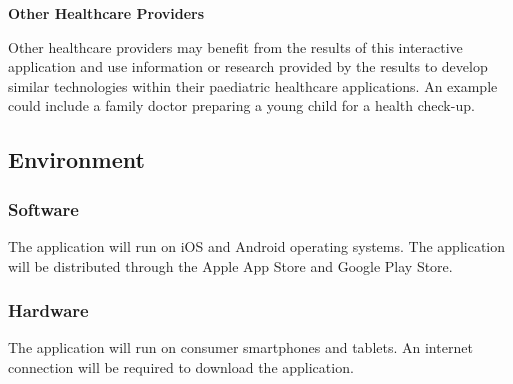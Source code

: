 \documentclass{article}
\begin{document}
        \textbf{Other Healthcare Providers}

        Other healthcare providers may benefit from the results of this interactive 
        application and use information or research provided by the results to develop 
        similar technologies within their paediatric healthcare applications. An example 
        could include a family doctor preparing a young child for a health check-up.

\subsection{Environment}

\subsubsection{Software}

The application will run on iOS and Android operating systems. The application will be distributed through the Apple App Store and Google Play Store.

\subsubsection{Hardware}

The application will run on consumer smartphones and tablets. An internet connection will be required to download the application.
\end{document}
